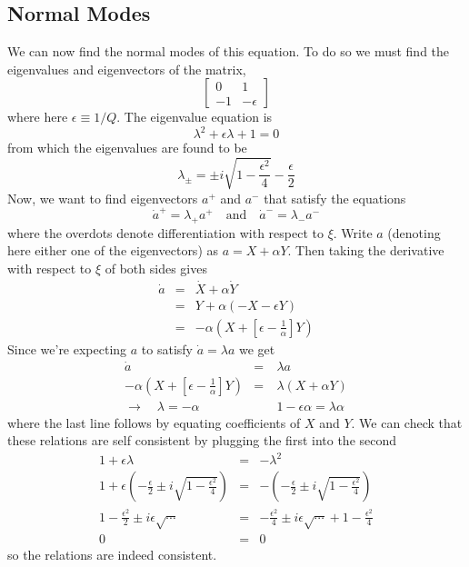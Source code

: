 \documentclass{article}
\begin{document}
\subsection{Normal Modes}
We can now find the normal modes of this equation.
To do so we must find the eigenvalues and eigenvectors of the matrix, \begin{equation}
\left[ \begin{array}{cc} 0 & 1 \\ -1 & -\epsilon \end{array} \right] \end{equation}
where here $\epsilon \equiv 1/Q$.
The eigenvalue equation is \begin{equation}
\lambda^2 + \epsilon \lambda + 1 = 0 \end{equation}
from which the eigenvalues are found to be \begin{equation}
\lambda_{\pm} = \pm i \sqrt{1 - \frac{\epsilon^2}{4}} - \frac{\epsilon}{2} \end{equation}
Now, we want to find eigenvectors $a^+$ and $a^-$ that satisfy the equations \begin{equation}
\dot{a}^+=\lambda_+ a^+ \quad \textrm{and} \quad \dot{a}^-=\lambda_- a^- \end{equation}
where the overdots denote differentiation with respect to $\xi$.
Write $a$ (denoting here either one of the eigenvectors) as $a = X+\alpha Y$.
Then taking the derivative with respect to $\xi$ of both sides gives \begin{eqnarray}
\dot{a} &=& \dot{X}+\alpha \dot{Y}\\
&=& Y+\alpha(-X-\epsilon Y)\\
&=& -\alpha \left( X+\left[ \epsilon - \frac{1}{\alpha} \right] Y \right) \end{eqnarray}
Since we're expecting $a$ to satisfy $\dot{a} = \lambda a$ we get \begin{eqnarray}
\dot{a} &=& \lambda a \\
-\alpha \left( X+\left[ \epsilon - \frac{1}{\alpha} \right] Y \right) &=& \lambda \left( X + \alpha Y \right) \\
\rightarrow \quad \lambda=-\alpha &\quad& 1-\epsilon \alpha = \lambda \alpha \end{eqnarray}
where the last line follows by equating coefficients of $X$ and $Y$.
We can check that these relations are self consistent by plugging the first into the second \begin{eqnarray}
1+\epsilon \lambda &=& -\lambda^2 \\
1+\epsilon \left( -\frac{\epsilon}{2} \pm i \sqrt{1-\frac{\epsilon^2}{4}} \right) &=&
-\left(-\frac{\epsilon}{2}\pm i \sqrt{1-\frac{\epsilon^2}{4}} \right) \\
1-\frac{\epsilon^2}{2}\pm i \epsilon \sqrt{\cdots} &=&
-\frac{\epsilon^2}{4}\pm i \epsilon\sqrt{\cdots} + 1 -\frac{\epsilon^2}{4}\\
0 &=& 0 \end{eqnarray}
so the relations are indeed consistent.
\end{document}
